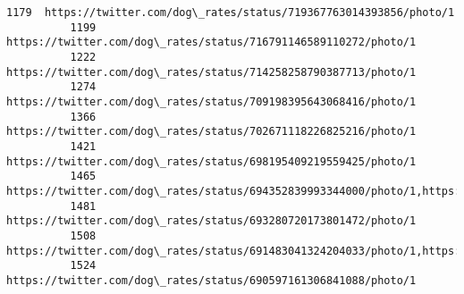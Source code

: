 \documentclass[11pt]{article}
\begin{document}
\begin{Verbatim}[commandchars=\\\{\}]
          1179  https://twitter.com/dog\_rates/status/719367763014393856/photo/1                                                                                                                                                                                                   
          1199  https://twitter.com/dog\_rates/status/716791146589110272/photo/1                                                                                                                                                                                                   
          1222  https://twitter.com/dog\_rates/status/714258258790387713/photo/1                                                                                                                                                                                                   
          1274  https://twitter.com/dog\_rates/status/709198395643068416/photo/1                                                                                                                                                                                                   
          1366  https://twitter.com/dog\_rates/status/702671118226825216/photo/1                                                                                                                                                                                                   
          1421  https://twitter.com/dog\_rates/status/698195409219559425/photo/1                                                                                                                                                                                                   
          1465  https://twitter.com/dog\_rates/status/694352839993344000/photo/1,https://twitter.com/dog\_rates/status/694352839993344000/photo/1,https://twitter.com/dog\_rates/status/694352839993344000/photo/1,https://twitter.com/dog\_rates/status/694352839993344000/photo/1   
          1481  https://twitter.com/dog\_rates/status/693280720173801472/photo/1                                                                                                                                                                                                   
          1508  https://twitter.com/dog\_rates/status/691483041324204033/photo/1,https://twitter.com/dog\_rates/status/691483041324204033/photo/1,https://twitter.com/dog\_rates/status/691483041324204033/photo/1,https://twitter.com/dog\_rates/status/691483041324204033/photo/1   
          1524  https://twitter.com/dog\_rates/status/690597161306841088/photo/1                                                                                                                                                                                                   

\end{Verbatim}
\end{document}
